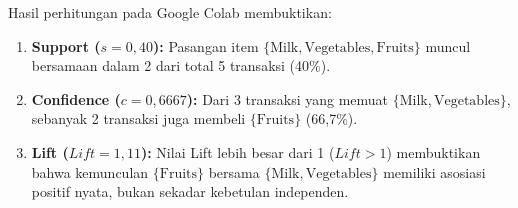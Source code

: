 \documentclass[a4paper,oneside,12pt]{report}
\begin{document}
Hasil perhitungan pada Google Colab membuktikan:
\begin{enumerate}[noitemsep, topsep=2pt, parsep=1pt]
    \item \textbf{Support ($s = 0{,}40$):} Pasangan item $\{\text{Milk}, \text{Vegetables}, \text{Fruits}\}$ muncul bersamaan dalam 2 dari total 5 transaksi (40\%).
    \item \textbf{Confidence ($c = 0{,}6667$):} Dari 3 transaksi yang memuat $\{\text{Milk}, \text{Vegetables}\}$, sebanyak 2 transaksi juga membeli $\{\text{Fruits}\}$ (66{,}7\%).
    \item \textbf{Lift ($\mathit{Lift} = 1{,}11$):} Nilai Lift lebih besar dari 1 ($\mathit{Lift} > 1$) membuktikan bahwa kemunculan $\{\text{Fruits}\}$ bersama $\{\text{Milk}, \text{Vegetables}\}$ memiliki asosiasi positif nyata, bukan sekadar kebetulan independen.
\end{enumerate}


\clearpage
\end{document}
